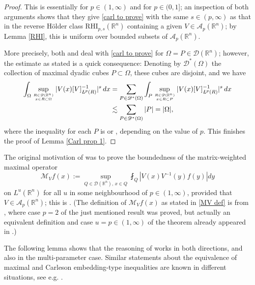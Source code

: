\documentclass[11pt, reqno]{amsart}
\theoremstyle{definition}
\theoremstyle{remark}
\numberwithin{equation}{section}
\newcommand{\A}{\mathscr A}
\newcommand{\D}{\mathscr D}
\newcommand{\R}{\mathbb R}
\newcommand{\aveL}{\textit{\L}}
\newcommand{\abs}[1]{|#1|}
\newcommand{\RHI}{\mathrm{RHI}}
\begin{document}
\begin{proof}
This is essentially \cite[Lemma 3.3]{Gold03} for $p\in(1,\infty)$ and \cite[Lemma 3.3]{FR21} for $p\in(0,1]$; an inspection of both arguments shows that they give \eqref{carl to prove} with the same $s\in(p,\infty)$ as that in the reverse H\"older class $\RHI_{p,s}(\R^n)$ containing a given $V\in\A_p(\R^n)$; by Lemma \ref{RHI}, this is uniform over bounded subsets of $\A_p(\R^n)$.

More precisely, both \cite[Lemma 3.3]{Gold03} and  \cite[Lemma 3.3]{FR21} deal with \eqref{carl to prove} for $\Omega=P\in\D(\R^n)$; however, the estimate as stated is a quick consequence: Denoting by $\D^*(\Omega)$ the collection of maximal dyadic cubes $P\subset\Omega$, these cubes are disjoint, and we have
\begin{align*}
\int_{\Omega}\sup_{\genfrac{}{}{0pt}{}{R\in\D(\R^n)}{x\in R\subset\Omega}}
\abs{V(x)[V]_{\aveL^p(R)}^{-1}}^s \, dx
&=\sum_{P\in\D^*(\Omega)}\int_P \sup_{\genfrac{}{}{0pt}{}{R\in\D(\R^n)}{x\in R\subset P}}
\abs{V(x)[V]_{\aveL^p(R)}^{-1}}^s \, dx \\
&\lesssim\sum_{P\in\D^*(\Omega)}\abs{P}=\abs{\Omega},
\end{align*}
where the inequality for each $P$ is \cite[Lemma 3.3]{Gold03} or \cite[Lemma 3.3]{FR21}, depending on the value of $p$.
This finishes the proof of Lemma \ref{Carl prop 1}.
\end{proof}

The original motivation of \cite[Lemma 3.3]{Gold03} was to prove the boundedness of the matrix-weighted maximal operator
\begin{equation}\label{MV def}
\mathcal M_V f(x):=\sup_{Q\in\D(\R^n),\, x\in Q} \fint_Q\abs{V(x)V^{-1}(y)f(y)}dy
\end{equation}
on $L^u(\R^n)$ for all $u$ in some neighbourhood of $p\in(1,\infty)$, provided that $V\in\A_p(\R^n)$; this is \cite[Theorem 3.2]{Gold03}.
(The definition of $\mathcal M_Vf(x)$ as stated in \eqref{MV def} is from \cite[p.\,1996]{CG01}, where case $p=2$ of the just mentioned result was proved, but actually an equivalent definition and case $u=p\in(1,\infty)$ of the theorem already appeared in \cite[p.\,121]{NT96}.)

The following lemma shows that the reasoning of \cite{Gold03} works in both directions, and also in the multi-parameter case. Similar statements about the equivalence of maximal and Carleson embedding-type inequalities are known in different situations, see e.g. \cite{HK11}.
\end{document}
